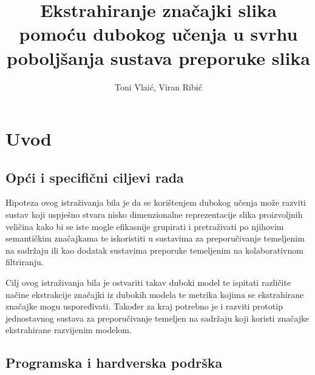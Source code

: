 \documentclass[times, utf8, proizvoljni, numeric]{fer}
\begin{document}
\title{Ekstrahiranje značajki slika pomoću dubokog učenja u svrhu poboljšanja sustava preporuke slika}
\author{Toni Vlaić, Viran Ribić}

\maketitle

\thispagestyle{empty}

\tableofcontents
\thispagestyle{empty}
\listoftables
\thispagestyle{empty}
\listoffigures
\thispagestyle{empty}
\chapter{Uvod}


\section{Opći i specifični ciljevi rada}

Hipoteza ovog istraživanja bila je da se korištenjem dubokog učenja može razviti sustav koji uspješno stvara nisko dimenzionalne reprezentacije slika proizvoljnih veličina kako bi se iste mogle efikasnije grupirati i pretraživati po njihovim semantičkim značajkama te iskoristiti u sustavima za preporučivanje temeljenim na sadržaju ili kao dodatak sustavima preporuke temeljenim na kolaborativnom filtriranju.

Cilj ovog istraživanja bila je ostvariti takav duboki model te ispitati različite načine ekstrakcije značajki iz dubokih modela te metrika kojima se ekstrahirane značajke mogu uspoređivati. Također za kraj potrebno je i razviti prototip jednostavnog sustava za preporučivanje temeljen na sadržaju koji koristi značajke ekstrahirane razvijenim modelom.

\section{Programska i hardverska podrška}
\end{document}
